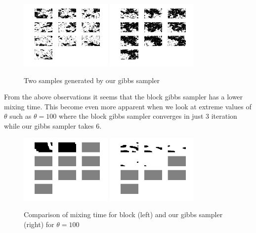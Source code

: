 \documentclass[10pt,onecolumn,letterpaper]{article}
\begin{document}
\begin{figure}[htbp]
  \centering
    \includegraphics[width=0.4\textwidth]{Images/gibbs_sampler_1.png}
    \hfill
	\includegraphics[width=0.4\textwidth]{Images/gibbs_sampler_2.png}
    \caption{Two samples generated by our gibbs sampler} 
\end{figure}

From the above observations it seems that the block gibbs sampler has a lower mixing time. This become even more apparent when we look at extreme values of
$\theta$ such as $\theta=100$ where the block gibbs sampler converges
in just 3 iteration while our gibbs sampler takes 6.

\begin{figure}[htbp]
  \centering
    \includegraphics[width=0.4\textwidth]{Images/block_theta_100.png}
    \hfill
\includegraphics[width=0.4\textwidth]{Images/gibbs_sampler_theta_100.png}
    \caption{Comparison of mixing time for block (left) and our gibbs
sampler (right) for $\theta=100$}
\end{figure}
\end{document}
